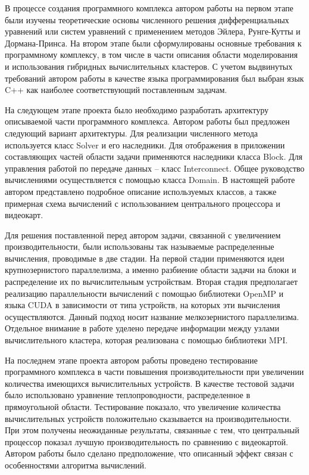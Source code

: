 \documentclass[a4paper, 14pt]{extarticle}
\theoremstyle{definition}
\begin{document}
\par В процессе создания программного комплекса автором работы на первом этапе были изучены теоретические основы численного решения дифференциальных уравнений или систем уравнений с применением методов Эйлера, Рунге-Кутты и Дормана-Принса. На втором этапе были сформулированы основные требования к программному комплексу, в том числе в части описания области моделирования и использования гибридных вычислительных кластеров. С учетом выдвинутых требований автором работы в качестве языка программирования был выбран язык C++ как наиболее соответствующий поставленным задачам.

\par На следующем этапе проекта было необходимо разработать архитектуру описываемой части программного комплекса. Автором работы был предложен следующий вариант архитектуры. Для реализации численного метода используется класс Solver и его наследники. Для отображения в приложении составляющих частей области задачи применяются наследники класса Block. Для управления работой по передаче данных -- класс Interconnect. Общее руководство вычислениями осуществляется с помощью класса Domain. В настоящей работе автором представлено подробное описание используемых классов, а также примерная схема вычислений с использованием центрального процессора и видеокарт.

\par Для решения поставленной перед автором задачи, связанной с увеличением производительности, были использованы так называемые распределенные вычисления, проводимые в две стадии. На первой стадии применяются идеи крупнозернистого параллелизма, а именно разбиение области задачи на блоки и распределение их по вычислительным устройствам. Вторая стадия предполагает реализацию параллельности вычислений с помощью библиотеки OpenMP и языка CUDA в зависимости от типа устройств, на которых эти вычисления осуществляются. Данный подход носит название мелкозернистого параллелизма. Отдельное внимание в работе уделено передаче информации между узлами вычислительного кластера, которая реализована с помощью библиотеки MPI.

\par На последнем этапе проекта автором работы проведено тестирование программного комплекса в части повышения производительности при увеличении количества имеющихся вычислительных устройств. В качестве тестовой задачи было использовано уравнение теплопроводности, распределенное в прямоугольной области. Тестирование показало, что увеличение количества вычислительных устройств положительно сказывается на производительности. При этом получены неожиданные результаты, связанные с тем, что центральный процессор показал лучшую производительность по сравнению с видеокартой. Автором работы было сделано предположение, что описанный эффект связан с особенностями алгоритма вычислений.
\end{document}
